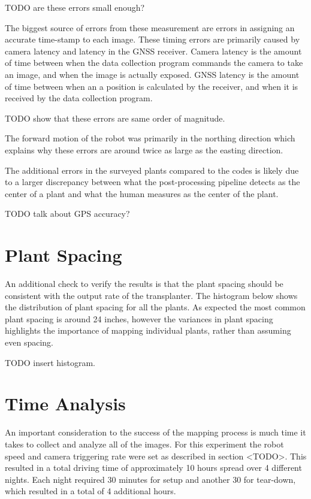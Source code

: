 TODO are these errors small enough?



The biggest source of errors from these measurement are errors in assigning an accurate time-stamp to each image.  These timing errors are primarily caused by camera latency and latency in the GNSS receiver.  Camera latency is the amount of time between when the data collection program commands the camera to take an image, and when the image is actually exposed.  GNSS latency is the amount of time between when an a position is calculated by the receiver, and when it is received by the data collection program.  

TODO show that these errors are same order of magnitude.

The forward motion of the robot was primarily in the northing direction which explains why these errors are around twice as large as the easting direction.  

The additional errors in the surveyed plants compared to the codes is likely due to a larger discrepancy between what the post-processing pipeline detects as the center of a plant and what the human measures as the center of the plant. 

TODO talk about GPS accuracy?

\section{Plant Spacing}

An additional check to verify the results is that the plant spacing should be consistent with the output rate of the transplanter.  The histogram below shows the distribution of plant spacing for all the plants.  As expected the most common plant spacing is around 24 inches, however the variances in plant spacing highlights the importance of mapping individual plants, rather than assuming even spacing.

TODO insert histogram.

\section{Time Analysis}

An important consideration to the success of the mapping process is much time it takes to collect and analyze all of the images. For this experiment the robot speed and camera triggering rate were set as described in section <TODO>.  This resulted in a total driving time of approximately 10 hours spread over 4 different nights.  Each night required 30 minutes for setup and another 30 for tear-down, which resulted in a total of 4 additional hours.  

